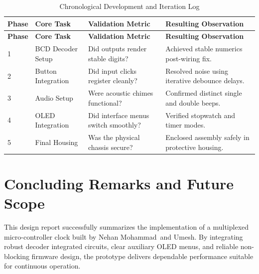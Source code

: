 \documentclass[12pt,letterpaper]{article}
\newcommand{\TeamMemberOne}{Nehan Mohammad}
\newcommand{\TeamMemberTwo}{Umesh}
\begin{document}
\begin{longtable}{@{}p{15mm}p{38mm}p{44mm}p{45mm}@{}}
\caption{Chronological Development and Iteration Log}
\label{tab:development-diary-redesigned}
\\
\toprule
\textbf{Phase} & \textbf{Core Task} & \textbf{Validation Metric} & \textbf{Resulting Observation} \\
\midrule
\endfirsthead
\toprule
\textbf{Phase} & \textbf{Core Task} & \textbf{Validation Metric} & \textbf{Resulting Observation} \\
\midrule
\endhead
1 & BCD Decoder Setup & Did outputs render stable digits? & Achieved stable numerics post-wiring fix. \\
2 & Button Integration & Did input clicks register cleanly? & Resolved noise using iterative debounce delays. \\
3 & Audio Setup & Were acoustic chimes functional? & Confirmed distinct single and double beeps. \\
4 & OLED Integration & Did interface menus switch smoothly? & Verified stopwatch and timer modes. \\
5 & Final Housing & Was the physical chassis secure? & Enclosed assembly safely in protective housing. \\
\bottomrule
\end{longtable}

\clearpage
\section{Concluding Remarks and Future Scope}

This design report successfully summarizes the implementation of a multiplexed micro-controller clock built by \TeamMemberOne\ and \TeamMemberTwo. By integrating robust decoder integrated circuits, clear auxiliary OLED menus, and reliable non-blocking firmware design, the prototype delivers dependable performance suitable for continuous operation.
\end{document}

